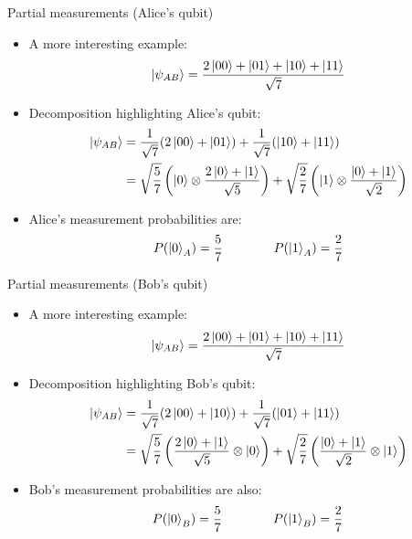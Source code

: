 \documentclass[aspectratio=169,12pt]{beamer}
\begin{document}
\begin{frame}{Partial measurements (Alice's qubit)}
  \begin{itemize}[<+->]
    \item A more interesting example:
    \begin{equation*}
      \ket{\psi_{AB}} = \frac{2\ket{00} + \ket{01} + \ket{10} + \ket{11}}{\sqrt{7}}
    \end{equation*}
    \item Decomposition highlighting Alice's qubit:
    \begin{align*}
      \ket{\psi_{AB}} 
      &= \frac{1}{\sqrt{7}} (2\ket{00} + \ket{01}) + \frac{1}{\sqrt{7}} (\ket{10} + \ket{11})\\
      &= \sqrt{\frac{5}{7}} \left( \ket{0} \otimes \frac{2\ket{0}+\ket{1}}{\sqrt{5}} \right) + \sqrt{\frac{2}{7}} \left( \ket{1} \otimes \frac{\ket{0}+\ket{1}}{\sqrt{2}} \right)
    \end{align*}
    \item Alice's measurement probabilities are:
    \begin{equation*}
      P(\ket{0}_A) = \frac{5}{7} \qquad\qquad P(\ket{1}_A) = \frac{2}{7}
    \end{equation*}
  \end{itemize}
\end{frame}

\begin{frame}{Partial measurements (Bob's qubit)}
  \begin{itemize}
    \item A more interesting example:
    \begin{equation*}
      \ket{\psi_{AB}} = \frac{2\ket{00} + \ket{01} + \ket{10} + \ket{11}}{\sqrt{7}}
    \end{equation*}
    \item Decomposition highlighting Bob's qubit:
    \begin{align*}
      \ket{\psi_{AB}} 
      &= \frac{1}{\sqrt{7}} (2\ket{00} + \ket{10}) + \frac{1}{\sqrt{7}} (\ket{01} + \ket{11})\\
      &= \sqrt{\frac{5}{7}} \left( \frac{2\ket{0}+\ket{1}}{\sqrt{5}} \otimes \ket{0} \right) + \sqrt{\frac{2}{7}} \left( \frac{\ket{0}+\ket{1}}{\sqrt{2}} \otimes \ket{1} \right)
    \end{align*}
    \item Bob's measurement probabilities are also:
    \begin{equation*}
      P(\ket{0}_B) = \frac{5}{7} \qquad\qquad P(\ket{1}_B) = \frac{2}{7}
    \end{equation*}
  \end{itemize}
\end{frame}
\end{document}
